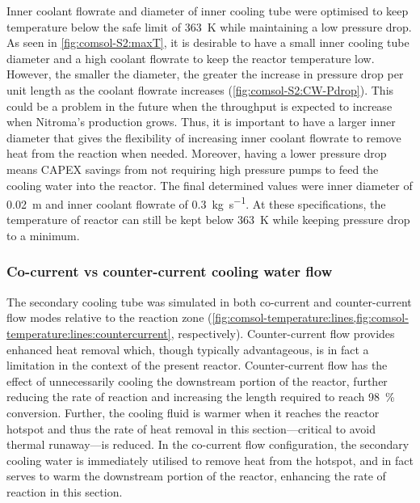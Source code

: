 Inner coolant flowrate and diameter of inner cooling tube were optimised to keep temperature below the safe limit of \SI{363}{\K} while maintaining a low pressure drop. As seen in \cref{fig:comsol-S2:maxT}, it is desirable to have a small inner cooling tube diameter and a high coolant flowrate to keep the reactor temperature low. However, the smaller the diameter, the greater the increase in pressure drop per unit length as the coolant flowrate increases (\cref{fig:comsol-S2:CW-Pdrop}). This could be a problem in the future when the throughput is expected to increase when Nitroma's production grows. Thus, it is important to have a larger inner diameter that gives the flexibility of increasing inner coolant flowrate to remove heat from the reaction when needed. Moreover, having a lower pressure drop means CAPEX savings from not requiring high pressure pumps to feed the cooling water into the reactor. The final determined values were inner diameter of \SI{0.02}{\m} and inner coolant flowrate of \SI{0.3}{\kg\per\s}. At these specifications, the temperature of reactor can still be kept below \SI{363}{\K} while keeping pressure drop to a minimum.

\subsubsection{Co-current vs counter-current cooling water flow}
The secondary cooling tube was simulated in both co-current and counter-current flow modes relative to the reaction zone (\cref{fig:comsol-temperature:lines,fig:comsol-temperature:lines:countercurrent}, respectively). Counter-current flow provides enhanced heat removal which, though typically advantageous, is in fact a limitation in the context of the present reactor. Counter-current flow has the effect of unnecessarily cooling the downstream portion of the reactor, further reducing the rate of reaction and increasing the length required to reach \SI{98}{\percent} conversion. Further, the cooling fluid is warmer when it reaches the reactor hotspot and thus the rate of heat removal in this section---critical to avoid thermal runaway---is reduced. In the co-current flow configuration, the secondary cooling water is immediately utilised to remove heat from the hotspot, and in fact serves to warm the downstream portion of the reactor, enhancing the rate of reaction in this section.

